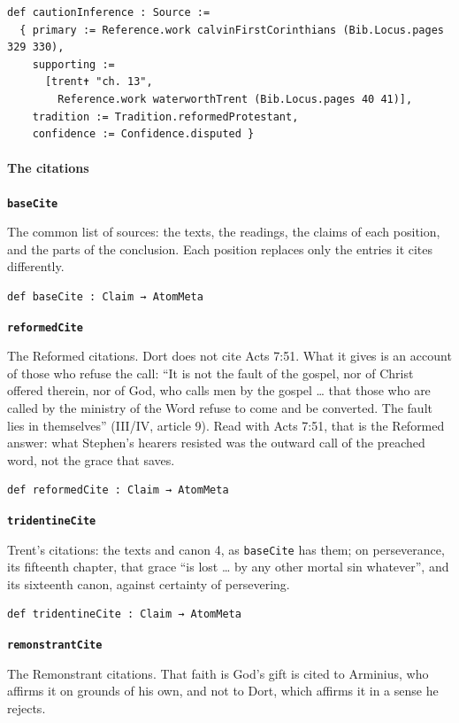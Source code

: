 \documentclass[11pt]{article}
\begin{document}
{\small\begin{verbatim}
def cautionInference : Source :=
  { primary := Reference.work calvinFirstCorinthians (Bib.Locus.pages 329 330),
    supporting :=
      [trent✝ "ch. 13",
        Reference.work waterworthTrent (Bib.Locus.pages 40 41)],
    tradition := Tradition.reformedProtestant,
    confidence := Confidence.disputed }
\end{verbatim}}
\paragraph*{The citations}
\leavevmode\par\nobreak
\par\medskip\noindent\textbf{\texttt{base\allowbreak{}Cite}}\par\nobreak\noindent
The common list of sources: the texts, the readings, the claims of each position, and the parts of the conclusion. Each position replaces only the entries it cites differently.

{\small\begin{verbatim}
def baseCite : Claim → AtomMeta
\end{verbatim}}
\par\medskip\noindent\textbf{\texttt{reformed\allowbreak{}Cite}}\par\nobreak\noindent
The Reformed citations. Dort does not cite Acts 7:51. What it gives is an account of those who refuse the call: “It is not the fault of the gospel, nor of Christ offered therein, nor of God, who calls men by the gospel … that those who are called by the ministry of the Word refuse to come and be converted. The fault lies in themselves” (III/IV, article 9). Read with Acts 7:51, that is the Reformed answer: what Stephen’s hearers resisted was the outward call of the preached word, not the grace that saves.

{\small\begin{verbatim}
def reformedCite : Claim → AtomMeta
\end{verbatim}}
\par\medskip\noindent\textbf{\texttt{tridentine\allowbreak{}Cite}}\par\nobreak\noindent
Trent’s citations: the texts and canon 4, as \texttt{base\allowbreak{}Cite} has them; on perseverance, its fifteenth chapter, that grace “is lost … by any other mortal sin whatever”, and its sixteenth canon, against certainty of persevering.

{\small\begin{verbatim}
def tridentineCite : Claim → AtomMeta
\end{verbatim}}
\par\medskip\noindent\textbf{\texttt{remonstrant\allowbreak{}Cite}}\par\nobreak\noindent
The Remonstrant citations. That faith is God’s gift is cited to Arminius, who affirms it on grounds of his own, and not to Dort, which affirms it in a sense he rejects.
\end{document}
